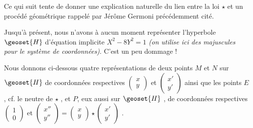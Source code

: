 Ce qui suit tente de donner une explication naturelle du lien entre la loi $\star$ et un procédé géométrique rappelé par Jérôme Germoni précédemment cité.


\bigskip

Jusqu'à présent, nous n'avons à aucun moment représenter l'hyperbole $\geoset{H}$  d'équation implicite $X^2 - 8 Y^2 = 1$ \textit{(on utilise ici des majuscules pour le système de coordonnées)}. C'est un peu dommage !


\medskip

Nous donnons ci-dessous quatre représentations de deux points $M$ et $N$ sur $\geoset{H}$ de coordonnées respectives 
$\begin{pmatrix}
  x \\ 
  y 
\end{pmatrix}$
et
$\begin{pmatrix} 
  x' \\ 
  y' 
\end{pmatrix}$
ainsi que les points $E$ , cf. le neutre de $\star$ , et $P$, eux aussi sur $\geoset{H}$ , de coordonnées respectives 
$\begin{pmatrix}
  1 \\ 
  0 
\end{pmatrix}$
et
$\begin{pmatrix} 
  x'' \\ 
  y''
\end{pmatrix}
=
\begin{pmatrix}
  x \\ 
  y 
\end{pmatrix}
\star
\begin{pmatrix} 
  x' \\ 
  y'
\end{pmatrix}$ .


\bigskip


